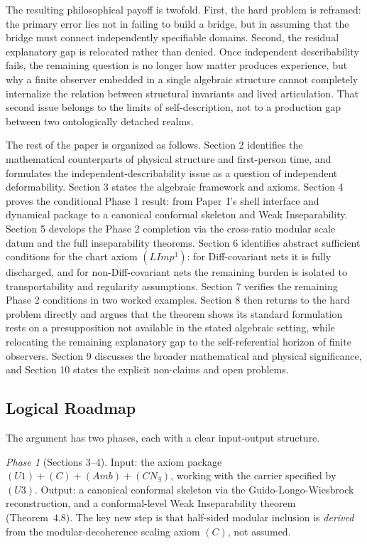 \documentclass[12pt]{article}
\theoremstyle{definition}
\theoremstyle{remark}
\begin{document}
The resulting philosophical payoff is twofold. First, the hard problem
is reframed: the primary error lies not in failing to build a bridge,
but in assuming that the bridge must connect independently specifiable
domains. Second, the residual explanatory gap is relocated rather than
denied. Once independent describability fails, the remaining question is
no longer how matter produces experience, but why a finite observer
embedded in a single algebraic structure cannot completely internalize
the relation between structural invariants and lived articulation. That
second issue belongs to the limits of self-description, not to a
production gap between two ontologically detached realms.

The rest of the paper is organized as follows. Section 2 identifies the
mathematical counterparts of physical structure and first-person time,
and formulates the independent-describability issue as a question of
independent deformability. Section 3 states the algebraic framework and
axioms. Section 4 proves the conditional Phase 1 result: from Paper~I's
shell interface and dynamical package to a canonical conformal skeleton
and Weak Inseparability.
Section 5 develops the Phase 2 completion via the cross-ratio
modular scale datum and the full inseparability theorems.
Section 6 identifies abstract sufficient conditions for the chart axiom
$(LImp^1)$: for Diff-covariant nets it is fully discharged, and for
non-Diff-covariant nets the remaining burden is isolated to
transportability and regularity assumptions.
Section 7 verifies the remaining Phase 2 conditions in two worked examples.
Section 8 then returns to
the hard problem directly and argues that the theorem shows its
standard formulation rests on a presupposition not available in the
stated algebraic setting, while relocating the remaining explanatory gap to
the self-referential horizon of finite observers. Section 9 discusses
the broader mathematical and physical significance, and Section 10 states
the explicit non-claims and open problems.

\subsection{Logical Roadmap}\label{subsec:roadmap}

The argument has two phases, each with a clear input-output structure.

\emph{Phase 1} (Sections 3--4). Input: the axiom package
\((U1)+(C)+(Amb)+(CN_\exists)\), working with the carrier specified by
\((U3)\). Output: a canonical conformal skeleton via the
Guido-Longo-Wiesbrock reconstruction, and a conformal-level Weak
Inseparability theorem (Theorem~4.8). The key new step is that
half-sided modular inclusion is \emph{derived} from the
modular-decoherence scaling axiom \((C)\), not assumed.
\end{document}

